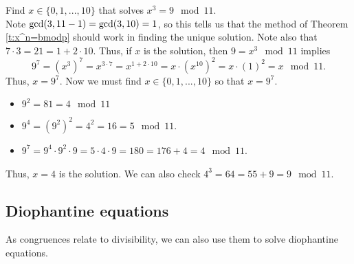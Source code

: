 \documentclass[11pt,dvipsnames]{book}
\def\gcd{{\rm gcd}}
\numberwithin{equation}{section} %
\numberwithin{figure}{section} %
\numberwithin{table}{section} %
\begin{document}
\begin{example}
 Find $x\in\{0,1,...,10\}$ that solves $x^{3} = 9 \mod 11$.  \\

Note $\gcd(3,11-1)=\gcd(3,10)=1$, so this tells us that the method of Theorem \ref{t:x^n=bmodp} should work in finding the unique solution. Note also that $7\cdot 3 = 21=1+2\cdot 10$.  Thus, if $x$ is the solution, then $9 = x^{3}\mod 11$ implies  
\[
9^{7} = (x^{3})^{7}  
=x^{3\cdot 7}  
 =x^{1+2\cdot 10}   
  =x\cdot (x^{10})^{2}  
   = x\cdot(1)^{2}  
  =x \mod 11.\]
  Thus, $x = 9^{7}$. Now we must find $x\in \{0,1,...,10\}$ so that $x = 9^{7}$.   
  \begin{itemize}
  \item $9^{2}=81   = 4 \mod 11$
  \item $9^{4}=(9^{2})^{2}   = 4^{2}  =16 = 5\mod 11$.   
  \item $9^{7}=9^{4}\cdot 9^{2}\cdot 9  = 5\cdot 4\cdot 9 =180 =176+4 = 4\mod 11$. 
  \end{itemize}
    
Thus, $x=4$ is the solution.  We can also check $4^{3}=64=55+9 = 9\mod 11$. 


\end{example}



\subsection{Diophantine equations}

As congruences relate to divisibility, we can also use them to solve diophantine equations. 
\end{document}
